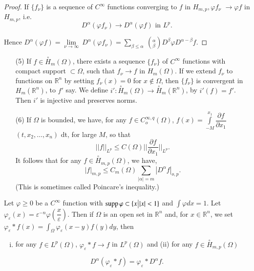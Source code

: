 \begin{proof}
  If ${\{f_\nu}\}$ is a sequence of $C^{\infty}$ functions converging
  to $f$ in $H_{m, p},\varphi f_{\nu}$ $\to \varphi f$ in $H_{m, p}$,
  i.e.\pageoriginale 
  $$
  D^\alpha (\varphi f _\nu) \to D^\alpha (\varphi f ) \text { in } L^p.
  $$
  
  Hence \qquad $D^\alpha (\varphi f) = \lim\limits_{\nu \to \infty} ~
  D^\alpha (\varphi f_\nu ) = \sum\limits_{\beta \le \alpha} ~
  (^{\alpha}_{\beta}) D^\beta \varphi D^{\alpha - \beta} f$. 
\end{proof}

\begin{enumerate} 
\item[(5)] If $f \in \overset{\circ}{H}_m (\Omega)$, there exists a
  sequence $\{f_\nu\}$ of $C^\infty$ functions with compact support
  $\subset \Omega$, such that $f_\nu \to f$ in $H_m (\Omega)$. If we
  extend $f_\nu$ to functions on $\mathbb{R}^n$ by setting $f_\nu (x)
  = 0$ for $x \notin \Omega$, then $\{f_\nu\}$ is convergent in $H_m
  (\mathbb{R}^n)$, to $f'$ say. We define $i' : \overset{\circ}{H}_m
  (\Omega) \to \overset{\circ}{H}_m (\mathbb{R}^n)$, by $i' (f) =
  f'$. Then $i'$ is injective and preserves norms. 
\item[(6)] If $\Omega$ is bounded, we have, for any $f \in C^{\infty,
  q}_o (\Omega)$, $f(x) = \int\limits^{x_1}_{-M} \dfrac{\partial
  f}{\partial x_1}$ $(t, x_2, \ldots , x_n)$ dt, for large $M$, so that 
  $$
  || f ||_{L^p} \le C(\Omega) || \frac{\partial f}{\partial x_1} ||_{L^p}.
  $$  
  It follows that for any $f \in \overset{\circ}{H}_{m, p} (\Omega)$, we have,
  $$
  | f |_{m, p} \le C_m (\Omega) \sum_{| \alpha | = m} | D^\alpha f |_{o, p}.
  $$
  (This is sometimes called Poincare's inequality.)
\end{enumerate}

\setcounter{lemma}{0}
\begin{lemma}\label{chap3:sec5:lem1} %
  Let $\varphi \ge 0$ be a $C^\infty$ function with $\operatorname{supp} \varphi
  \subset \{ x \big| | x | < 1 \}$ and $\int\limits \varphi dx =
  1$. Let $\varphi_ \varepsilon (x) = \varepsilon^{-n} \varphi
  (\dfrac{x}{\varepsilon})$. Then if $\Omega$ is an open set in
  $\mathbb{R}^n$ and, for $x \in \mathbb{R}^n$, we set $\varphi_
  \varepsilon * f(x)= \int_{\Omega} \varphi _ \varepsilon (x- y) f(y)
  dy$, then  
  \begin{enumerate}[(i)]
  \item  for any $f \in L^p ( \Omega)$, $\varphi_ \varepsilon * f \to
    f$ in $L^p (\Omega)$ and (ii) for any $f \in \overset{\circ}{H}_{m, p}
    (\Omega)$ 
  \end{enumerate}
  $$
  D^\alpha (\varphi_ \varepsilon *  f) = \varphi_ \varepsilon * D^\alpha f.
  $$
\end{lemma}

